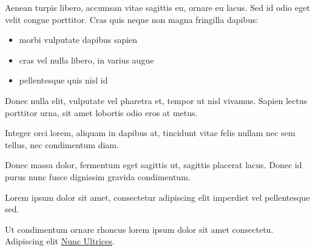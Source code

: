 \documentclass[10pt]{article}\usepackage[]{graphicx}\usepackage[]{color}
\begin{document}
\begin{minipage}[t]{.66\linewidth}

\hypertarget{secondnews}{} %

Aenean turpis libero, accumsan vitae sagittis eu, ornare eu lacus. Sed id odio eget velit congue porttitor. Cras quis neque non magna fringilla dapibus:

\begin{itemize}
\item morbi vulputate dapibus sapien
\item cras vel nulla libero, in varius augue
\item pellentesque quis nisl id 
\end{itemize}

Donec nulla elit, vulputate vel pharetra et, tempor ut nisl vivamus. Sapien lectus porttitor urna, sit amet lobortis odio eros at metus.

Integer orci lorem, aliquam in dapibus at, tincidunt vitae felis nullam nec sem tellus, nec condimentum diam.

Donec massa dolor, fermentum eget sagittis ut, sagittis placerat lacus. Donec id purus nunc fusce dignissim gravida condimentum. 

Lorem ipsum dolor sit amet, consectetur adipiscing elit imperdiet vel pellentesque sed.

Ut condimentum ornare rhoncus lorem ipsum dolor sit amet consectetu. Adipiscing elit \href{http://www.example.com}{Nunc Ultrices}.

\end{minipage} %

\end{document}
